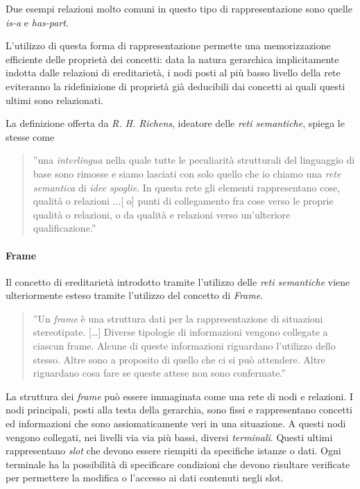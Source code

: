 Due esempi relazioni molto comuni in questo tipo di rappresentazione sono quelle  \emph{is-a} e \emph{has-part}. 

L'utilizzo di questa forma di rappresentazione permette una memorizzazione efficiente delle proprietà dei concetti: data la natura gerarchica implicitamente indotta dalle relazioni di ereditarietà, i nodi posti al più basso livello della rete eviteranno la ridefinizione di proprietà già deducibili dai concetti ai quali questi ultimi sono relazionati.

La definizione offerta da \emph{R. H. Richens}, ideatore delle \emph{reti semantiche}, spiega le stesse come
\begin{quote}
''una \emph{interlingua} nella quale tutte le peculiarità strutturali del linguaggio di base sono rimosse e siamo lasciati con solo quello che io chiamo una \emph{rete semantica} di \emph{idee spoglie}. In questa rete gli elementi rappresentano cose, qualità o relazioni $\dots$[ o] punti di collegamento fra cose verso le proprie qualità o relazioni, o da qualità e relazioni verso un'ulteriore qualificazione.'' \cite{richens1956}
\end{quote}

\paragraph{Frame}
Il concetto di ereditarietà introdotto tramite l'utilizzo delle \emph{reti semantiche} viene ulteriormente esteso tramite l'utilizzo del concetto di \emph{Frame}. 
\begin{quote}
''Un \emph{frame} è una struttura dati per la rappresentazione di situazioni stereotipate. [\dots] Diverse tipologie di informazioni vengono collegate a ciascun frame. Alcune di queste informazioni riguardano l'utilizzo dello stesso. Altre sono a proposito di quello che ci si può attendere. Altre riguardano cosa fare se queste attese non sono confermate.'' \cite{minsky1974}
\end{quote}

La struttura dei \emph{frame} può essere immaginata come una rete di nodi e relazioni. I nodi principali, posti alla testa della gerarchia, sono fissi e rappresentano concetti ed informazioni che sono assiomaticamente veri in una situazione. A questi nodi vengono collegati, nei livelli via via più bassi, diversi \emph{terminali}. Questi ultimi rappresentano \emph{slot} che devono essere riempiti da specifiche istanze o dati. Ogni terminale ha la possibilità di specificare condizioni che devono risultare verificate per permettere la modifica o l'accesso ai dati contenuti negli slot. 

